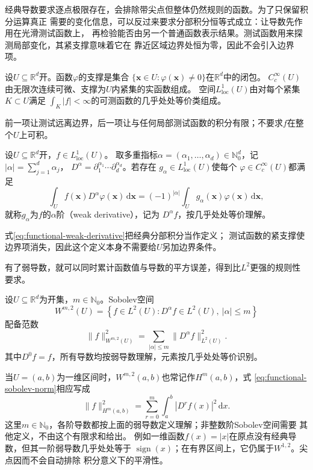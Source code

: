 经典导数要求逐点极限存在，会排除带尖点但整体仍然规则的函数。为了只保留积分运算真正
需要的变化信息，可以反过来要求分部积分恒等式成立：让导数先作用在光滑测试函数上，
再检验能否由另一个普通函数表示结果。测试函数用来探测局部变化，其紧支撑意味着它在
靠近区域边界处恒为零，因此不会引入边界项。
\begin{definition}[测试函数与局部可积性]
\label{def:functional-tests-local-integrability}
设$U\subseteq\mathbb R^d$开。函数$\varphi$的支撑是集合
$\{\bm x\in U:\varphi(\bm x)\neq0\}$在$\mathbb R^d$中的闭包。
$C_c^\infty(U)$由无限次连续可微、支撑为$U$内紧集的实函数组成。
空间$L^1_{\mathrm{loc}}(U)$由对每个紧集$K\subset U$满足
$\int_K|f|<\infty$的可测函数的几乎处处等价类组成。
\end{definition}
前一项让测试远离边界，后一项让与任何局部测试函数的积分有限；不要求$f$在整个$U$上可积。
\begin{definition}[弱导数]
\label{def:functional-weak-derivative}
设$U\subseteq\mathbb R^d$开，$f\in L^1_{\mathrm{loc}}(U)$。
取多重指标$\alpha=(\alpha_1,\ldots,\alpha_d)\in\mathbb{N}_0^d$，记
$|\alpha|=\sum_{j=1}^d\alpha_j$，
$D^\alpha=\partial_1^{\alpha_1}\cdots\partial_d^{\alpha_d}$。若存在
$g_\alpha\in L^1_{\mathrm{loc}}(U)$使每个
$\varphi\in C_c^\infty(U)$都满足
\begin{equation}
  \int_U f(\bm{x})D^\alpha\varphi(\bm{x})\,\mathrm{d}\bm{x}
  =
  (-1)^{|\alpha|}
  \int_U g_\alpha(\bm{x})\varphi(\bm{x})\,\mathrm{d}\bm{x},
  \label{eq:functional-weak-derivative}
\end{equation}
就称$g_\alpha$为$f$的$\alpha$阶（weak derivative），记为
$D^\alpha f$，按几乎处处等价理解。
\end{definition}
式\eqref{eq:functional-weak-derivative}把经典分部积分当作定义；
测试函数的紧支撑使边界项消失，因此这个定义本身不需要给$U$另加边界条件。

有了弱导数，就可以同时累计函数值与导数的平方误差，得到比$L^2$更强的规则性要求。
\begin{definition}[整数阶平方可积Sobolev空间]
\label{def:functional-sobolev-space}
设$U\subseteq\mathbb R^d$为开集，$m\in\mathbb N_0$。Sobolev空间
\[
  W^{m,2}(U)
  =
  \left\{
    f\in L^2(U):
    D^\alpha f\in L^2(U),\ |\alpha|\leq m
  \right\}
\]
配备范数
\begin{equation}
  \lVert f\rVert_{W^{m,2}(U)}^2
  =
  \sum_{|\alpha|\leq m}
  \lVert D^\alpha f\rVert_{L^2(U)}^2.
  \label{eq:functional-sobolev-norm}
\end{equation}
其中$D^0f=f$，所有导数均按弱导数理解，元素按几乎处处等价识别。
\end{definition}
当$U=(a,b)$为一维区间时，$W^{m,2}(a,b)$也常记作$H^m(a,b)$，式
\eqref{eq:functional-sobolev-norm}相应写成
\[
  \lVert f\rVert_{H^m(a,b)}^2
  =
  \sum_{r=0}^{m}
  \int_a^b|D^r f(x)|^2\,\mathrm{d}x.
\]
这里$m\in\mathbb{N}_0$，各阶导数都按上面的弱导数定义理解；非整数阶Sobolev空间需要
其他定义，不由这个有限求和给出。
例如一维函数$f(x)=|x|$在原点没有经典导数，但其一阶弱导数几乎处处等于
$\operatorname{sign}(x)$；在有界区间上，它仍属于$W^{1,2}$。尖点因而不会自动排除
积分意义下的平滑性。

